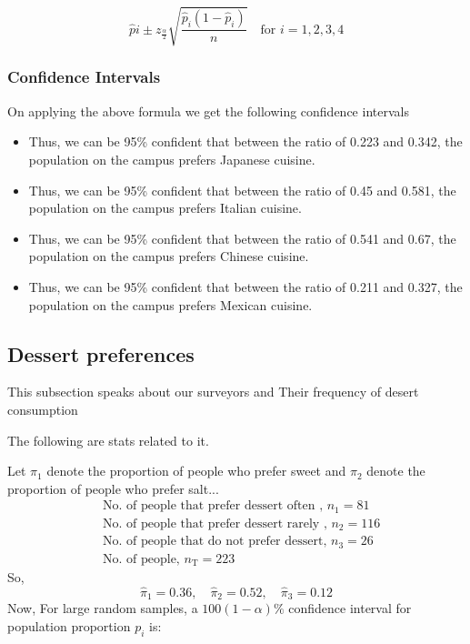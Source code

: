 \documentclass[12pt]{article}
\begin{document}
    \[
    \hat{p}i \pm z_{\frac{\alpha}{2}} \sqrt{\frac{\hat{p}_i(1 - \hat{p}_i)}{n}}
    \quad \text{for } i = 1, 2, 3, 4
    \]
\subsubsection{Confidence Intervals}
    On applying the above formula we get the following confidence intervals
    \begin{itemize}
         \item Thus, we can be 95\% confident that between the ratio of 0.223 and 0.342, the population on the campus prefers Japanese cuisine.
        
        \item Thus, we can be 95\% confident that between the ratio of 0.45 and 0.581, the population on the campus prefers Italian cuisine.
        
        \item Thus, we can be 95\% confident that between the ratio of 0.541 and 0.67, the population on the campus prefers Chinese cuisine.
        
        \item Thus, we can be 95\% confident that between the ratio of 0.211 and 0.327, the population on the campus prefers Mexican cuisine.
    \end{itemize}


\subsection{Dessert preferences}
    This subsection speaks about  our surveyors and Their frequency of desert consumption 
    
    The following are stats related to it.
    
    Let $\pi_1$ denote the proportion of people who prefer sweet and $\pi_2$ denote the proportion of people who prefer salt...
    \begin{align}
        &\text{No. of people that prefer dessert often , } n_{\text{1}} = 81 \\
        &\text{No. of people that prefer dessert rarely , } n_{\text{2}} = 116 \\
        &\text{No. of people that do not prefer dessert, } n_{\text{3}} = 26\\
        &\text{No. of people, } n_{\text{T}} = 223
    \end{align}
    So,
    \begin{equation}
        \hat{\pi}_1  = 0.36, \quad \hat{\pi}_2  = 0.52, \quad \hat{\pi}_3  = 0.12
    \end{equation}
  Now,
  For large random samples, a $100(1 - \alpha)\%$ confidence interval for population proportion $p_i$ is:
    
\end{document}
